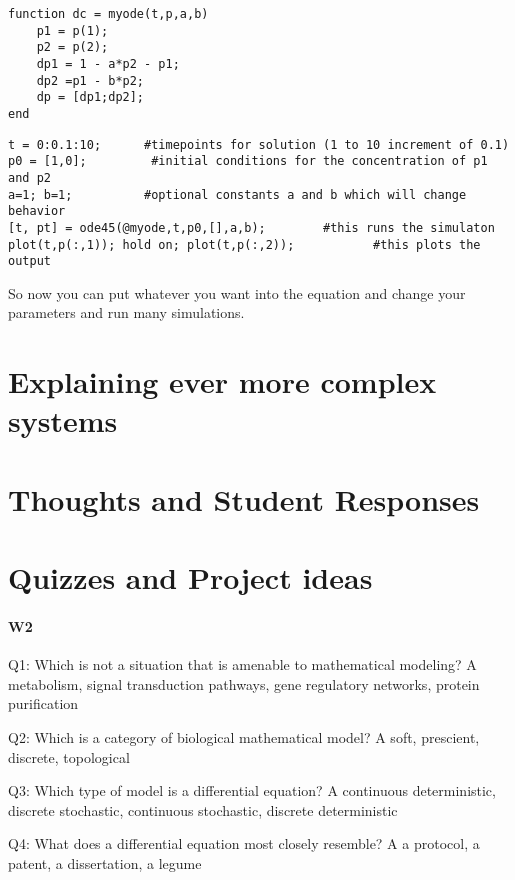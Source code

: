 \begin{verbatim}
function dc = myode(t,p,a,b)
    p1 = p(1);
    p2 = p(2);
    dp1 = 1 - a*p2 - p1;
    dp2 =p1 - b*p2;
    dp = [dp1;dp2];
end
\end{verbatim}

\begin{verbatim}
t = 0:0.1:10;      #timepoints for solution (1 to 10 increment of 0.1)
p0 = [1,0];         #initial conditions for the concentration of p1 and p2
a=1; b=1;          #optional constants a and b which will change behavior
[t, pt] = ode45(@myode,t,p0,[],a,b);        #this runs the simulaton 
plot(t,p(:,1)); hold on; plot(t,p(:,2));           #this plots the output
\end{verbatim}

So now you can put whatever you want into the equation and change your parameters and run many simulations.  





\section{Explaining ever more complex systems}




\section{Thoughts and Student Responses}

\section{Quizzes and Project ideas}
\paragraph{W2}
Q1: Which is not a situation that is amenable to mathematical modeling?
A metabolism, signal transduction pathways, gene regulatory networks, protein purification

Q2: Which is a category of biological mathematical model?
A soft, prescient, discrete, topological

Q3: Which type of model is a differential equation?
A continuous deterministic, discrete stochastic, continuous stochastic, discrete deterministic

Q4: What does a differential equation most closely resemble?
A a protocol, a patent, a dissertation, a legume


